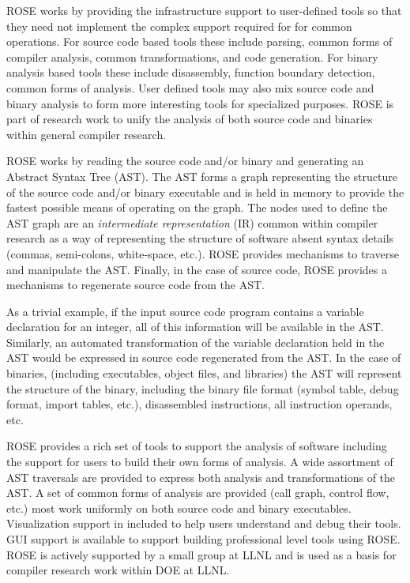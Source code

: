    ROSE works by providing the infrastructure support to
user-defined tools so that they need not implement the 
complex support required for for common operations. 
For source code based tools these include parsing, common forms of 
compiler analysis, common transformations, and code generation.
For binary analysis based tools these include disassembly,
function boundary detection, common forms of analysis.
User defined tools may also mix source code and binary analysis
to form more interesting tools for specialized purposes.
ROSE is part of research work to unify the analysis of
both source code and binaries within general compiler research.

   ROSE works by reading the source code and/or binary
and generating an Abstract Syntax Tree (AST).  The AST forms
a graph representing the structure of the source code and/or binary
executable and is held in memory to provide the fastest possible means 
of operating on the graph.  The nodes used to define the AST graph are 
an {\em intermediate representation} (IR) common within compiler research
as a way of representing the structure of software absent syntax details
(commas, semi-colons, white-space, etc.).  ROSE provides mechanisms to 
traverse and manipulate the AST. Finally, in the case of source code, 
ROSE provides a mechanisms to regenerate source code from the AST.

   As a trivial example, if the input source code program contains a variable declaration
for an integer, all of this information will be available in the AST.
Similarly, an automated transformation of the variable declaration 
held in the AST would be expressed in source code regenerated from the 
AST.  In the case of binaries, (including executables, object files, and libraries)
the AST will represent the structure of the binary, including the 
binary file format (symbol table, debug format, import tables, etc.), 
disassembled instructions, all instruction operands, etc.

  ROSE provides a rich set of tools to support the analysis of 
software including the support for users to build their own forms
of analysis.  A wide assortment of AST traversals are provided
to express both analysis and transformations of the AST. A set of
common forms of analysis are provided (call graph, control flow, etc.)
most work uniformly on both source code and binary executables.
Visualization support in included to help users understand and debug
their tools.  GUI support is available to support building professional
level tools using ROSE. ROSE is actively supported by a small
group at LLNL and is used as a basis for compiler research work within 
DOE at LLNL.


